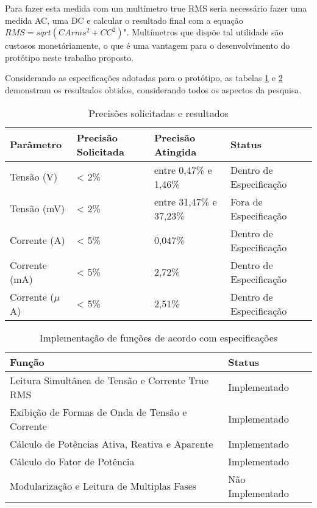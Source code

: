 Para fazer esta medida com um multímetro true RMS seria necessário fazer uma medida AC, uma DC e calcular o resultado final com a equação $RMS=sqrt(CArms^2+CC^2)$". Multímetros que dispõe tal utilidade são custosos monetáriamente, o que é uma vantagem para o desenvolvimento do protótipo neste trabalho proposto. 

Considerando as especificações adotadas para o protótipo, as tabelas \ref{tab:resultados-precis} e \ref{tab:resultados-func} demonstram os resultados obtidos, considerando todos os aspectos da pesquisa.

\begin{table}[!h]
    \centering
    \caption{Precisões solicitadas e resultados}
    \label{tab:resultados-precis}
    \begin{tabular}{ l l l l }
        \hline
        \textbf{Parâmetro} & \textbf{Precisão Solicitada} & \textbf{Precisão Atingida} & \textbf{Status}         \\ \hline
        Tensão (V)         & < 2\%                        & entre 0,47\% e 1,46\%      & Dentro de Especificação \\ 
        Tensão (mV)        & < 2\%                        & entre 31,47\% e 37,23\%    & Fora de Especificação   \\ 
        Corrente (A)       & < 5\%                        & 0,047\%                    & Dentro de Especificação \\ 
        Corrente (mA)      & < 5\%                        & 2,72\%                     & Dentro de Especificação  \\ 
        Corrente ($\mu$A)  & < 5\%                        & 2,51\%                     & Dentro de Especificação   \\ \hline
    \end{tabular}
    \fonte{}
\end{table}

\begin{table}[!h]
    \centering
    \caption{Implementação de funções de acordo com especificações}
    \label{tab:resultados-func}
    \begin{tabular}{ l l }
        \hline
        \textbf{Função}                                  & \textbf{Status} \\ \hline
        Leitura Simultânea de Tensão e Corrente True RMS & Implementado  \\ 
        Exibição de Formas de Onda de Tensão e Corrente  & Implementado  \\ 
        Cálculo de Potências Ativa, Reativa e Aparente   & Implementado  \\ 
        Cálculo do Fator de Potência                     & Implementado  \\ \hline
        Modularização e Leitura de Multiplas Fases       & Não Implementado  \\ \hline
    \end{tabular}
    \fonte{}
\end{table}

